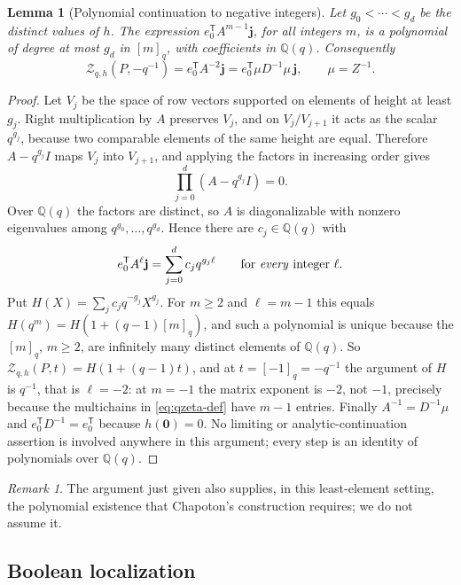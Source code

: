 \documentclass[11pt]{article}
\numberwithin{equation}{section}
\newtheorem{lemma}[theorem]{Lemma}
\theoremstyle{definition}
\theoremstyle{remark}
\newtheorem{remark}[theorem]{Remark}
\newcommand{\Q}{\mathbb Q}
\newcommand{\zero}{\mathbf 0}
\newcommand{\qint}[1]{[#1]_q}
\newcommand{\Zeta}{\mathcal Z}
\begin{document}
\begin{lemma}[Polynomial continuation to negative integers]
\label{lem:continuation}
Let $g_0<\cdots<g_d$ be the distinct values of $h$. The expression
$e_0^{\mathsf T}A^{m-1}\mathbf j$, for all integers $m$, is a polynomial of
degree at most $g_d$ in $\qint m$, with coefficients in $\Q(q)$. Consequently
\begin{equation}
 \Zeta_{q,h}(P,-q^{-1})=e_0^{\mathsf T}A^{-2}\mathbf j
 =e_0^{\mathsf T}\mu D^{-1}\mu\,\mathbf j,
 \qquad \mu=Z^{-1}.
 \label{eq:negative-matrix}
\end{equation}
\end{lemma}

\begin{proof}
Let $V_j$ be the space of row vectors supported on elements of height at least
$g_j$. Right multiplication by $A$ preserves $V_j$, and on $V_j/V_{j+1}$ it
acts as the scalar $q^{g_j}$, because two comparable elements of the same
height are equal. Therefore $A-q^{g_j}I$ maps $V_j$ into $V_{j+1}$, and
applying the factors in increasing order gives
\[
 \prod_{j=0}^{d}(A-q^{g_j}I)=0 .
\]
Over $\Q(q)$ the factors are distinct, so $A$ is diagonalizable with nonzero
eigenvalues among $q^{g_0},\ldots,q^{g_d}$. Hence there are $c_j\in\Q(q)$
with
\[
 e_0^{\mathsf T}A^{\ell}\mathbf j=\sum_{j=0}^{d}c_jq^{g_j\ell}
 \qquad\text{for \emph{every} integer }\ell .
\]
Put $H(X)=\sum_jc_jq^{-g_j}X^{g_j}$. For $m\ge2$ and $\ell=m-1$ this equals
$H(q^m)=H(1+(q-1)\qint m)$, and such a polynomial is unique because the
$\qint m$, $m\ge2$, are infinitely many distinct elements of $\Q(q)$. So
$\Zeta_{q,h}(P,t)=H(1+(q-1)t)$, and at $t=\qint{-1}=-q^{-1}$ the argument of
$H$ is $q^{-1}$, that is $\ell=-2$: at $m=-1$ the matrix exponent is $-2$,
not $-1$, precisely because the multichains in \eqref{eq:qzeta-def} have
$m-1$ entries. Finally $A^{-1}=D^{-1}\mu$ and $e_0^{\mathsf T}D^{-1}=e_0^{\mathsf T}$
because $h(\zero)=0$. No limiting or analytic-continuation assertion is
involved anywhere in this argument; every step is an identity of polynomials
over $\Q(q)$.
\end{proof}

\begin{remark}
The argument just given also supplies, in this least-element setting, the
polynomial existence that Chapoton's construction \cite{Chapoton} requires;
we do not assume it.
\end{remark}

\subsection{Boolean localization}
\end{document}
